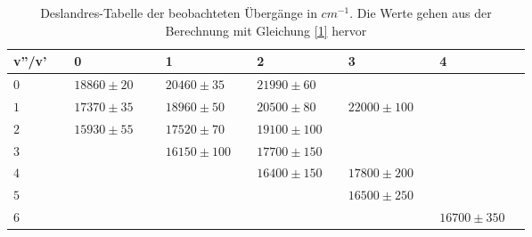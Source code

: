 \begin{table}[H]
 
\caption{Deslandres-Tabelle der beobachteten Übergänge in $\si{cm}^{-1}$. Die
Werte gehen aus der Berechnung mit Gleichung \ref{1} hervor}
\begin{tabular}{L{0.1\linewidth}|L{0.15\linewidth}L{0.15\linewidth}L{0.15\linewidth}L{0.15\linewidth}L{0.15\linewidth}}

 
v''/v' & 0 & 1 & 2 & 3 & 4 \\
\hline \addlinespace[1ex]
$0$ & $18860 \pm 20$ & $20460 \pm 35$ & $21990 \pm60$ &  &  \\
$1$ & $17370 \pm 35$ & $18960 \pm 50$ & $20500\pm 80$ & $22000\pm 100$ &  \\
$2$ & $15930 \pm 55$ & $17520 \pm 70$ & $19100 \pm 100$ &  & \\
$3$ &  & $16150\pm100$ & $17700\pm 150$ &  & \\
$4$ &  &  & $16400\pm150$ & $17800\pm200$ & \\
$5$ &  &  &  & $16500\pm 250$ & \\ 
$6$ &  &  &  & & $16700\pm 350$\\  
 \end{tabular}
 \label{tab2}
 \end{table}



%



